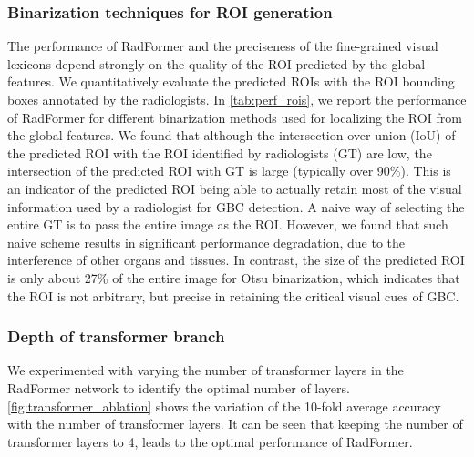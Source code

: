 \documentclass[twocolumn,final]{elsarticle}
\def\myarch{RadFormer\xspace}
\begin{document}
\subsubsection{Binarization techniques for ROI generation}
%
The performance of \myarch and the preciseness of the fine-grained visual lexicons depend strongly on the quality of the ROI predicted by the global features. We quantitatively evaluate  the predicted ROIs with the ROI bounding boxes annotated by the radiologists. In \cref{tab:perf_rois}, we report the performance of \myarch for different binarization methods used for localizing the ROI from the global features. We found that although the intersection-over-union (IoU) of the predicted ROI with the ROI identified by radiologists (GT) are low, the intersection of the predicted ROI with GT is large (typically over 90\%). This is an indicator of the predicted ROI being able to actually retain most of the visual information used by a radiologist for GBC detection. A naive way of selecting the entire GT is to pass the entire image as the ROI. However, we found that such naive scheme results in significant performance degradation, due to the interference of other organs and tissues. In contrast, the size of the predicted ROI is only about 27\% of the entire image for Otsu binarization, which indicates that the ROI is not arbitrary, but precise in retaining the critical visual cues of GBC.

\subsubsection{Depth of transformer branch}
%
We experimented with varying the number of transformer layers in the \myarch network to identify the optimal number of layers. \cref{fig:transformer_ablation} shows the variation of the 10-fold average accuracy with the number of transformer layers. It can be seen that keeping the number of transformer layers to 4, leads to the optimal performance of \myarch.
\end{document}
